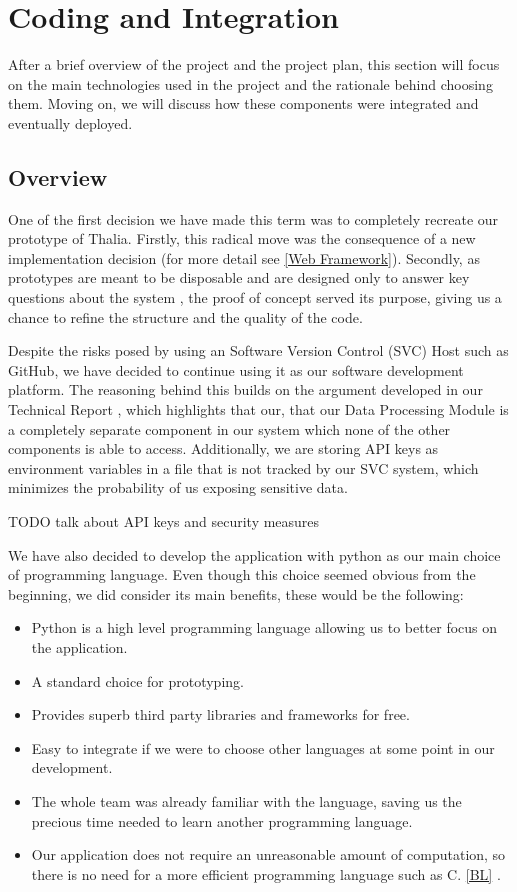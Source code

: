 \documentclass[main.tex]{subfiles}
\begin{document}
\section{Coding and Integration}

After a brief overview of the project and the project plan, this section will focus on the main technologies used in the project and the rationale behind choosing them. Moving on, we will discuss how these components were integrated and eventually deployed.

\subsection{Overview}

One of the first decision we have made this term was to completely recreate our prototype of Thalia. Firstly, this radical move was the consequence of a new implementation decision (for more detail see \ref{Web Framework}). Secondly, as prototypes are meant to be disposable and are designed only to answer key questions about the system \cite{pragmaticprog}, the proof of concept served its purpose, giving us a chance to refine the structure and the quality of the code.

Despite the risks posed by using an Software Version Control (SVC) Host such as GitHub, we have decided to continue using it as our software development platform. The reasoning behind this builds on the argument developed in our Technical Report \cite{TR_SVC}, which highlights that our, that our Data Processing Module is a completely separate component in our system which none of the other components is able to access. Additionally, we are storing API keys as environment variables in a file that is not tracked by our SVC system, which minimizes the probability of us exposing sensitive data.


TODO talk about API keys and security measures

We have also decided to develop the application with python as our main choice of programming language. Even though this choice seemed obvious from the beginning, we did consider its main benefits, these would be the following:

\begin{itemize}
    \item Python is a high level programming language allowing us to better focus on the application.
    \item A standard choice for prototyping.
    \item Provides superb third party libraries and frameworks for free.
    \item Easy to integrate if we were to choose other languages at some point in our development.
    \item The whole team was already familiar with the language, saving us the precious time needed to learn another programming language.
    \item Our application does not require an unreasonable amount of computation, so there is no need for a more efficient programming language such as C. \ref{BL} \cite{languagescomparison}.
\end{itemize}
\end{document}
